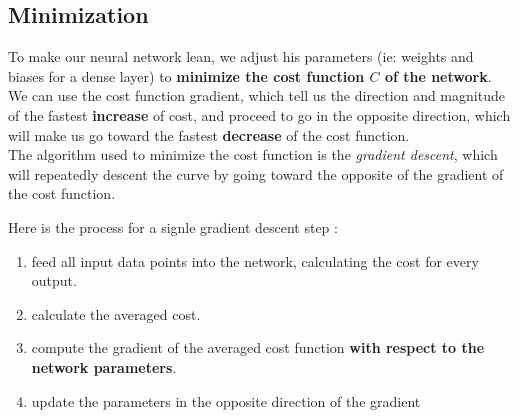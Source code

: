 \documentclass[a4paper, twocolumn, twoside]{article}
\begin{document}
	\subsection{Minimization}
	To make our neural network lean, we adjust his parameters (ie: weights and biases for a dense layer)
	to \textbf{minimize the cost function $C$ of the network}.
	We can use the cost function gradient, which tell us the direction and magnitude
	of the fastest \textbf{increase} of cost, and proceed to go in the opposite direction,
	which will make us go toward the fastest \textbf{decrease} of the cost function.\\
	The algorithm used to minimize the cost function is the \textit{gradient descent},
	which will repeatedly descent the curve by going toward the opposite of the gradient of the cost function.

	Here is the process for a signle gradient descent step :
	\begin{enumerate}
		\item feed all input data points into the network,
			calculating the cost for every output.
		\item calculate the averaged cost.
		\item compute the gradient of the averaged cost function \textbf{with respect to the network parameters}.
		\item update the parameters in the opposite direction of the gradient
	\end{enumerate}
\end{document}
